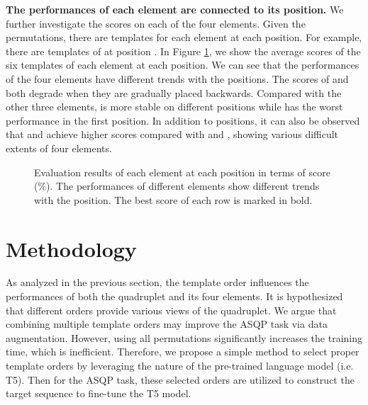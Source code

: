 \documentclass[11pt]{article}
\begin{document}
\textbf{The performances of each element are connected to its position.} We further investigate the  scores on each of the four elements. Given the  permutations, there are  templates for each element at each position. For example, there are  templates  of  at position . In Figure \ref{fig:figure_pre}, we show the average  scores of the six templates of each element at each position. 
We can see that the performances of the four elements have different trends with the positions. The  scores of  and  both degrade when they are gradually placed backwards. Compared with the other three elements,  is more stable on different positions while  has the worst performance in the first position. In addition to positions, it can also be observed that  and  achieve higher  scores compared with  and , showing various difficult extents of four elements. 






\begin{figure}[t]
\centering
{}
\caption{Evaluation results of each element at each position in terms of  score (\%). The performances of different elements show different trends with the position. The best score of each row is marked in bold.}
\label{fig:figure_pre}
\end{figure}





\section{Methodology}




As analyzed in the previous section, the template order influences the performances of both the quadruplet and its four elements. It is hypothesized that different orders provide various views of the quadruplet. We argue that combining multiple template orders may improve the ASQP task via data augmentation. However, using all  permutations significantly increases the training time, which is inefficient. Therefore, we propose a simple method to select proper template orders by leveraging the nature of the pre-trained language model (i.e. T5). Then for the ASQP task, these selected orders are utilized to construct the target sequence  to fine-tune the T5 model. 
\end{document}
